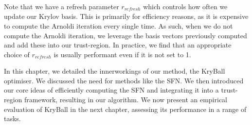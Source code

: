 Note that we have a refresh parameter $r_{\mathit{refresh}}$ which controls how often we update our Krylov basis. This is primarily for efficiency reasons, as it is expensive to compute the Arnoldi iteration every single time. As such, when we do not compute the Arnoldi iteration, we leverage the basis vectors previously computed and add these into our trust-region. In practice, we find that an appropriate choice of $r_{\mathit{refresh}}$ is usually performant even if it is not set to 1. 

\newpage

In this chapter, we detailed the innerworkings of our method, the KryBall optimiser. We discussed the need for methods like the SFN. We then introduced our core ideas of efficiently computing the SFN and integrating it into a trust-region framework, resulting in our algorithm. We now present an empirical evaluation of KryBall in the next chapter, assessing its performance in a range of tasks.